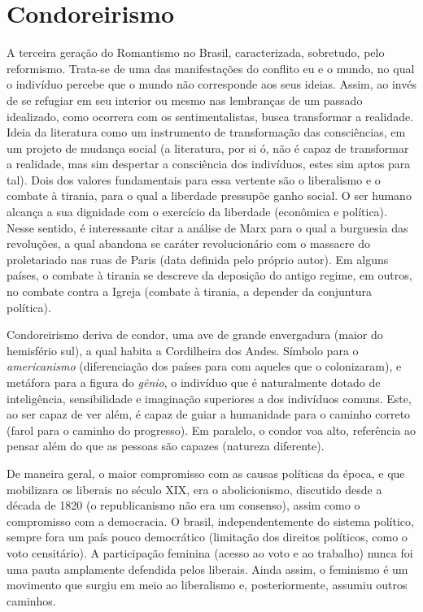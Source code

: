 \documentclass[12pt]{book}
\begin{document}
			\section{Condoreirismo}
			\par A terceira geração do Romantismo no Brasil, caracterizada, sobretudo, pelo reformismo. Trata-se de uma das manifestações do conflito eu e o mundo, no qual o indivíduo percebe que o mundo não corresponde aos seus ideias. Assim, ao invés de se refugiar em seu interior ou mesmo nas lembranças de um passado idealizado, como ocorrera com os sentimentalistas, busca transformar a realidade. Ideia da literatura como um instrumento de transformação das consciências, em um projeto de mudança social (a literatura, por si ó, não é capaz de transformar a realidade, mas sim despertar a consciência dos indivíduos, estes sim aptos para tal). Dois dos valores fundamentais para essa vertente são o liberalismo e o combate à tirania, para o qual a liberdade pressupõe ganho social. O ser humano alcança a sua dignidade com o exercício da liberdade (econômica e política). Nesse sentido, é interessante citar a análise de Marx para o qual a burguesia das revoluções, a qual abandona se caráter revolucionário com o massacre do proletariado nas ruas de Paris (data definida pelo próprio autor). Em alguns países, o combate à tirania se descreve da deposição do antigo regime, em outros, no combate contra a Igreja (combate à tirania, a depender da conjuntura política).
			\par Condoreirismo deriva de condor, uma ave de grande envergadura (maior do hemisfério sul), a qual habita a Cordilheira dos Andes. Símbolo para o \textit{americanismo} (diferenciação dos países para com aqueles que o colonizaram), e metáfora para a figura do \textit{gênio}, o indivíduo que é naturalmente dotado de inteligência, sensibilidade e imaginação superiores a dos indivíduos comuns. Este, ao ser capaz de ver além, é capaz de guiar a humanidade para o caminho correto (farol para o caminho do progresso). Em paralelo, o condor voa alto, referência ao pensar além do que as pessoas são capazes (natureza diferente).
			\par De maneira geral, o maior compromisso com as causas políticas da época, e que mobilizara os liberais no século XIX, era o abolicionismo, discutido desde a década de 1820 (o republicanismo não era um consenso), assim como o compromisso com a democracia. O brasil, independentemente do sistema político, sempre fora um país pouco democrático (limitação dos direitos políticos, como o voto censitário). A participação feminina (acesso ao voto e ao trabalho) nunca foi uma pauta amplamente defendida pelos liberais. Ainda assim, o feminismo é um movimento que surgiu em meio ao liberalismo e, posteriormente, assumiu outros caminhos.
\end{document}
